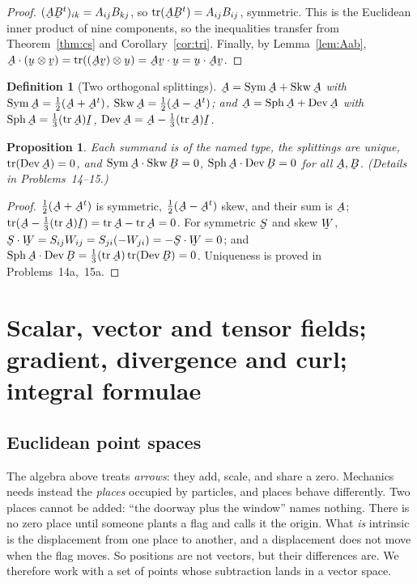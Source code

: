 \documentclass[17pt,a4paper]{extreport}
\DeclareRobustCommand{\vek}[1]{\underaccent{\tilde}{#1}}
\newcommand{\Sym}{\operatorname{Sym}}
\newcommand{\Skw}{\operatorname{Skw}}
\newcommand{\Sph}{\operatorname{Sph}}
\newcommand{\Dev}{\operatorname{Dev}}
\newcommand{\tr}{\operatorname{tr}}
\newcommand{\I}{\vek{I}}
\newcommand{\bu}{\vek{u}}
\newcommand{\bv}{\vek{v}}
\newcommand{\bA}{\vek{A}}
\newcommand{\bB}{\vek{B}}
\newcommand{\bS}{\vek{S}}
\newcommand{\bW}{\vek{W}}
\newcommand{\ip}[2]{#1\cdot#2}
\theoremstyle{scplain}
\newtheorem{proposition}[theorem]{Proposition}
\theoremstyle{scdefn}
\newtheorem{definition}[theorem]{Definition}
\theoremstyle{scplain}
\begin{document}
\begin{proof}
$(\bA\bB^{t})_{ik}=A_{ij}B_{kj}$, so $\tr(\bA\bB^{t})=A_{ij}B_{ij}$,
symmetric. This is the Euclidean inner product of nine components, so the
inequalities transfer from Theorem~\ref{thm:cs} and
Corollary~\ref{cor:tri}. Finally, by Lemma~\ref{lem:Aab},
$\bA\cdot(\bu\otimes\bv)=\tr((\bA\bv)\otimes\bu)=\ip{\bA\bv}\bu
=\ip\bu{\bA\bv}$.
\end{proof}

\begin{definition}[Two orthogonal splittings]\label{def:splits}
$\bA=\Sym\bA+\Skw\bA$ with $\Sym\bA=\tfrac12(\bA+\bA^{t})$,
$\Skw\bA=\tfrac12(\bA-\bA^{t})$; and
$\bA=\Sph\bA+\Dev\bA$ with $\Sph\bA=\tfrac13(\tr\bA)\I$,
$\Dev\bA=\bA-\tfrac13(\tr\bA)\I$.
\end{definition}

\begin{proposition}\label{prop:splits}
Each summand is of the named type, the splittings are unique,
$\tr(\Dev\bA)=0$, and $\Sym\bA\cdot\Skw\bB=0$,
$\Sph\bA\cdot\Dev\bB=0$ for all $\bA,\bB$. (Details in Problems~14--15.)
\end{proposition}

\begin{proof}
$\tfrac12(\bA+\bA^t)$ is symmetric, $\tfrac12(\bA-\bA^t)$ skew, and their
sum is $\bA$; $\tr(\bA-\tfrac13(\tr\bA)\I)=\tr\bA-\tr\bA=0$. For symmetric
$\bS$ and skew $\bW$, $\bS\cdot\bW=S_{ij}W_{ij}=S_{ji}(-W_{ji})
=-\bS\cdot\bW=0$; and
$\Sph\bA\cdot\Dev\bB=\tfrac13(\tr\bA)\tr(\Dev\bB)=0$. Uniqueness is proved
in Problems~14a,~15a.
\end{proof}

\section{Scalar, vector and tensor fields; gradient, divergence and curl;
integral formulae}\label{sec:fields}

\subsection{Euclidean point spaces}\label{ss:pts}

The algebra above treats \emph{arrows}: they add, scale, and share a zero.
Mechanics needs instead the \emph{places} occupied by particles, and places
behave differently. Two places cannot be added: ``the doorway plus the
window'' names nothing. There is no zero place until someone plants a flag
and calls it the origin. What \emph{is} intrinsic is the displacement from
one place to another, and a displacement does not move when the flag moves.
So positions are not vectors, but their differences are. We therefore work
with a set of points whose subtraction lands in a vector space.
\end{document}

